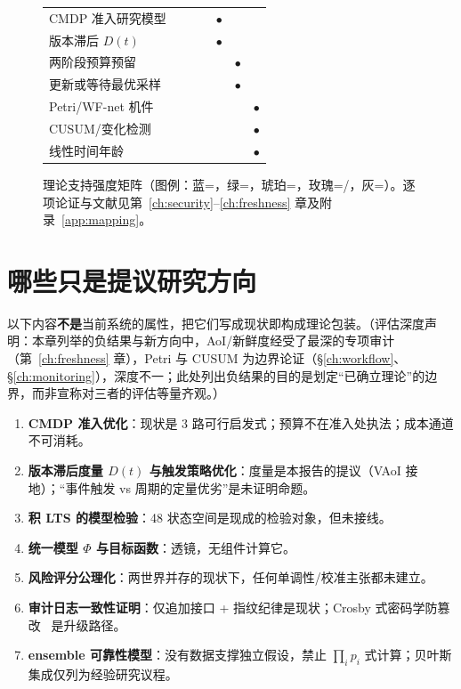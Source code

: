 \begin{figure}[htbp]
\begin{tabular}{@{}l|c|c|c|c|c|c@{}}
CMDP 准入研究模型 & & & & \cellcolor{softrose}$\bullet$ & & \\
版本滞后 $D(t)$ & & & & \cellcolor{softrose}$\bullet$ & & \\
\midrule
两阶段预算预留 & & & & & \cellcolor{boxgray}$\bullet$ & \\
更新或等待最优采样 & & & & & \cellcolor{boxgray}$\bullet$ & \\
Petri/WF-net 机件 & & & & & & \cellcolor{softrose}$\bullet$\\
CUSUM/变化检测 & & & & & & \cellcolor{softrose}$\bullet$\\
线性时间年龄 & & & & & & \cellcolor{softrose}$\bullet$\\
\bottomrule
\end{tabular}
\caption{理论支持强度矩阵（图例：蓝=\DIRECT，绿=\STRONG，琥珀=\USEFUL，玫瑰=\PROPOSED/\NA，灰=\WEAK）。逐项论证与文献见第~\ref{ch:security}--\ref{ch:freshness} 章及附录~\ref{app:mapping}。}
\label{fig:matrix}
\end{figure}

\chapter{哪些只是提议研究方向}\label{ch:proposed}

以下内容\textbf{不是}当前系统的属性，把它们写成现状即构成理论包装。（评估深度声明：本章列举的负结果与新方向中，AoI/新鲜度经受了最深的专项审计（第~\ref{ch:freshness} 章），Petri 与 CUSUM 为边界论证（\S\ref{ch:workflow}、\S\ref{ch:monitoring}），深度不一；此处列出负结果的目的是划定“已确立理论”的边界，而非宣称对三者的评估等量齐观。）
\begin{enumerate}[itemsep=0.05em]
  \item \textbf{CMDP 准入优化}：现状是 3 路可行启发式；预算不在准入处执法；成本通道不可消耗。
  \item \textbf{版本滞后度量 $D(t)$ 与触发策略优化}：度量是本报告的提议（VAoI 接地）；“事件触发 vs 周期的定量优劣”是未证明命题。
  \item \textbf{积 LTS 的模型检验}：48 状态空间是现成的检验对象，但未接线。
  \item \textbf{统一模型 $\Phi$ 与目标函数}：透镜，无组件计算它。
  \item \textbf{风险评分公理化}：两世界并存的现状下，任何单调性/校准主张都未建立。
  \item \textbf{审计日志一致性证明}：仅追加接口 + 指纹纪律是现状；Crosby 式密码学防篡改~\cite{crosby2009} 是升级路径。
  \item \textbf{ensemble 可靠性模型}：没有数据支撑独立假设，禁止 $\prod_i p_i$ 式计算；贝叶斯集成仅列为经验研究议程。
\end{enumerate}
